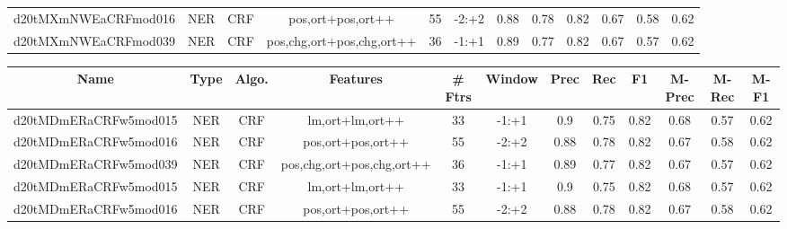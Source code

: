 \documentclass[a4paper]{article}
\begin{document}
\begin{landscape}
\begin{center}
\begin{tabular}{ |c|c|c|c|c|c|c|c|c|c|c|c|}
 	
 
 	
 		
 		\small{ d20tMXmNWEaCRFmod016 } & NER & CRF & pos,ort+pos,ort++  &  55 &  -2:+2  &  0.88 & 0.78 & 0.82  &  0.67 & 0.58 & 0.62 \\
 		

 	
 
 	
 		
 		\small{ d20tMXmNWEaCRFmod039 } & NER & CRF & pos,chg,ort+pos,chg,ort++  &  36 &  -1:+1  &  0.89 & 0.77 & 0.82  &  0.67 & 0.57 & 0.62 \\
 		
 \hline
\end{tabular}
\end{center}




\begin{center}
\begin{tabular}{ |c|c|c|c|c|c|c|c|c|c|c|c|} 
 \hline
 	Name & Type & Algo. & Features & \# Ftrs & Window & Prec & Rec & F1 & M-Prec & M-Rec & M-F1\\
 \hline

 		

 	
 
 	
 		
 		\small{ d20tMDmERaCRFw5mod015 } & NER & CRF & lm,ort+lm,ort++  &  33 &  -1:+1  &  0.9 & 0.75 & 0.82  &  0.68 & 0.57 & 0.62 \\
 		

 	
 
 	
 		
 		\small{ d20tMDmERaCRFw5mod016 } & NER & CRF & pos,ort+pos,ort++  &  55 &  -2:+2  &  0.88 & 0.78 & 0.82  &  0.67 & 0.58 & 0.62 \\
 		

 	
 
 	
 		
 		\small{ d20tMDmERaCRFw5mod039 } & NER & CRF & pos,chg,ort+pos,chg,ort++  &  36 &  -1:+1  &  0.89 & 0.77 & 0.82  &  0.67 & 0.57 & 0.62 \\
 		

 	
 
 	
 		
 		\small{ d20tMDmERaCRFw5mod015 } & NER & CRF & lm,ort+lm,ort++  &  33 &  -1:+1  &  0.9 & 0.75 & 0.82  &  0.68 & 0.57 & 0.62 \\
 		

 	
 
 	
 		
 		\small{ d20tMDmERaCRFw5mod016 } & NER & CRF & pos,ort+pos,ort++  &  55 &  -2:+2  &  0.88 & 0.78 & 0.82  &  0.67 & 0.58 & 0.62 \\
 		


\end{tabular}
\end{center}
\end{landscape}
\end{document}

